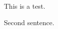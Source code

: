 \documentclass{scrartcl}
\begin{document}
      \begin{inparaenum}[1.]
        \item This is a test.
        \item Second sentence.
      \end{inparaenum}
    
\end{document}
